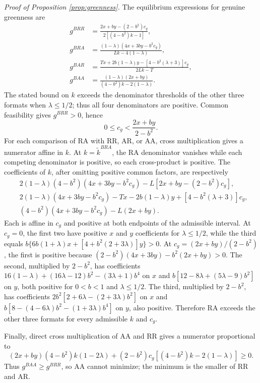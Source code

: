 \documentclass[preprint,review,12pt,authoryear,nopreprintline]{elsarticle}
\theoremstyle{definition}
\begin{document}
\noindent \textit{Proof of Proposition \ref{prop:greenness}.}
The equilibrium expressions for genuine greenness are
\begin{align*}
g^{BRR}&=\frac{2x+by-(2-b^2)c_g}{2[(4-b^2)k-1]},\\
g^{BRA}&=\frac{(1-\lambda)(4x+3by-b^2c_g)}{Lk-4(1-\lambda)},\\
g^{BAR}&=\frac{Tx+2b(1-\lambda)y-[4-b^2(\lambda+3)]c_g}{2Lk-T},\\
g^{BAA}&=\frac{(1-\lambda)(2x+by)}{(4-b^2)k-2(1-\lambda)}.
\end{align*}
The stated bound on $k$ exceeds the denominator thresholds of the other three formats when $\lambda\leq1/2$; thus all four denominators are positive. Common feasibility gives $g^{BRR}>0$, hence
\[
0\leq c_g<\frac{2x+by}{2-b^2}.
\]
For each comparison of RA with RR, AR, or AA, cross multiplication gives a numerator affine in $k$. At $k=\tilde{k}^{BRA}$, the RA denominator vanishes while each competing denominator is positive, so each cross-product is positive. The coefficients of $k$, after omitting positive common factors, are respectively
\begin{align*}
&2(1-\lambda)(4-b^2)(4x+3by-b^2c_g)-L[2x+by-(2-b^2)c_g],\\
&2(1-\lambda)(4x+3by-b^2c_g)
 -Tx-2b(1-\lambda)y+[4-b^2(\lambda+3)]c_g,\\
&(4-b^2)(4x+3by-b^2c_g)-L(2x+by).
\end{align*}
Each is affine in $c_g$ and positive at both endpoints of the admissible interval. At $c_g=0$, the first two have positive $x$ and $y$ coefficients for $\lambda\leq1/2$, while the third equals
$b\{6b(1+\lambda)x+[4+b^2(2+3\lambda)]y\}>0$.
At $c_g=(2x+by)/(2-b^2)$, the first is positive because
$(2-b^2)(4x+3by)-b^2(2x+by)>0$.
The second, multiplied by $2-b^2$, has coefficients
$16(1-\lambda)+(16\lambda-12)b^2-(3\lambda+1)b^4$ on $x$ and
$b[12-8\lambda+(5\lambda-9)b^2]$ on $y$, both positive for $0<b<1$ and $\lambda\leq1/2$.
The third, multiplied by $2-b^2$, has coefficients
$2b^2[2+6\lambda-(2+3\lambda)b^2]$ on $x$ and
$b[8-(4-6\lambda)b^2-(1+3\lambda)b^4]$ on $y$, also positive.
Therefore RA exceeds the other three formats for every admissible $k$ and $c_g$.

Finally, direct cross multiplication of AA and RR gives a numerator proportional to
\[
(2x+by)(4-b^2)k(1-2\lambda)
+(2-b^2)c_g[(4-b^2)k-2(1-\lambda)]\geq0.
\]
Thus $g^{BAA}\geq g^{BRR}$, so AA cannot minimize; the minimum is the smaller of RR and AR.
\end{document}
